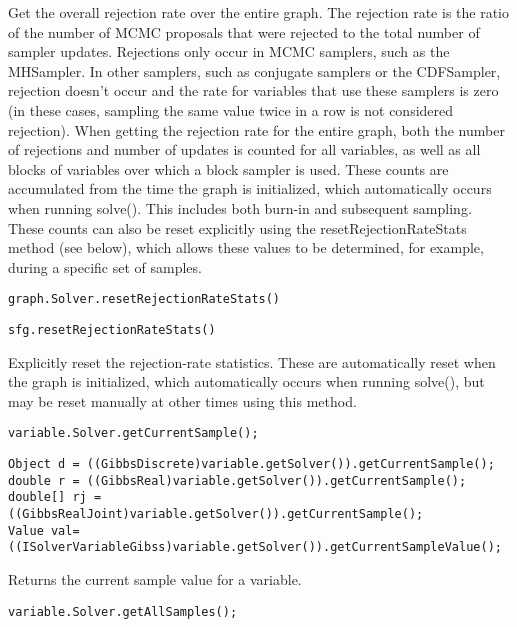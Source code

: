 Get the overall rejection rate over the entire graph.  The rejection rate is the ratio of the number of MCMC proposals that were rejected to the total number of sampler updates.  Rejections only occur in MCMC samplers, such as the MHSampler.  In other samplers, such as conjugate samplers or the CDFSampler, rejection doesn't occur and the rate for variables that use these samplers is zero (in these cases, sampling the same value twice in a row is not considered rejection).  When getting the rejection rate for the entire graph, both the number of rejections and number of updates is counted for all variables, as well as all blocks of variables over which a block sampler is used.  These counts are accumulated from the time the graph is initialized, which automatically occurs when running solve().  This includes both burn-in and subsequent sampling.  These counts can also be reset explicitly using the resetRejectionRateStats method (see below), which allows these values to be determined, for example, during a specific set of samples.

\ifmatlab
\begin{lstlisting}
graph.Solver.resetRejectionRateStats()
\end{lstlisting}
\fi

\ifjava
\begin{lstlisting}
sfg.resetRejectionRateStats()
\end{lstlisting}
\fi

Explicitly reset the rejection-rate statistics.  These are automatically reset when the graph is initialized, which automatically occurs when running solve(), but may be reset manually at other times using this method.



\ifmatlab
\begin{lstlisting}
variable.Solver.getCurrentSample();
\end{lstlisting}
\fi

\ifjava
\begin{lstlisting}
Object d = ((GibbsDiscrete)variable.getSolver()).getCurrentSample();
double r = ((GibbsReal)variable.getSolver()).getCurrentSample();
double[] rj = ((GibbsRealJoint)variable.getSolver()).getCurrentSample();
Value val= ((ISolverVariableGibss)variable.getSolver()).getCurrentSampleValue();
\end{lstlisting}
\fi

Returns the current sample value for a variable.

\ifmatlab
\begin{lstlisting}
variable.Solver.getAllSamples();
\end{lstlisting}
\fi


